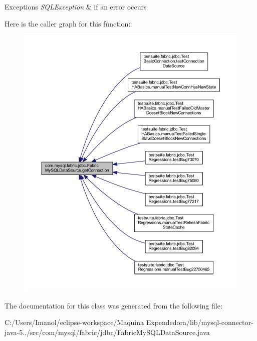 \begin{DoxyExceptions}{Exceptions}
{\em S\+Q\+L\+Exception} & if an error occurs \\
\hline
\end{DoxyExceptions}
Here is the caller graph for this function\+:\nopagebreak
\begin{figure}[H]
\begin{center}
\leavevmode
\includegraphics[width=350pt]{classcom_1_1mysql_1_1fabric_1_1jdbc_1_1_fabric_my_s_q_l_data_source_aaade1a90a7a191696ad1d05c3f79cc45_icgraph}
\end{center}
\end{figure}


The documentation for this class was generated from the following file\+:\begin{DoxyCompactItemize}
\item 
C\+:/\+Users/\+Imanol/eclipse-\/workspace/\+Maquina Expendedora/lib/mysql-\/connector-\/java-\/5../src/com/mysql/fabric/jdbc/Fabric\+My\+S\+Q\+L\+Data\+Source.\+java\end{DoxyCompactItemize}
